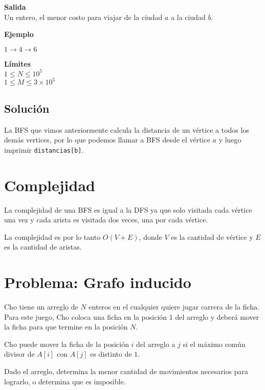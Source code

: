\textbf{Salida}\\
Un entero, el menor costo para viajar de la ciudad \(a\) a la ciudad \(b\).

\textbf{Ejemplo}\\
\begin{casebox3}
	 {
	\(1\rightarrow4\rightarrow6\)
	}
\end{casebox3}

\textbf{Límites}\\
\(1\leq N \leq 10^5\)\\
\(1\leq M \leq 3\times10^5\)

\subsection*{Solución}
La BFS que vimos anteriormente calcula la distancia de un vértice a todos los demás vertices, por lo que podemos llamar a BFS desde el vértice \(a\) y luego imprimir \lstinline|distancias[b]|.

\section{Complejidad}
La complejidad de una BFS es igual a la DFS ya que solo visitada cada vértice una vez y cada arista es visitada dos veces, una por cada vértice.

La complejidad es por lo tanto \(O(V+E)\), donde \(V\) es la cantidad de vértice y \(E\) es la cantidad de aristas.

\section*{Problema: Grafo inducido}
Cho tiene un arreglo de \(N\) enteros en el cualquier quiere jugar carrera de la ficha. Para este juego, Cho coloca una ficha en la posición \(1\) del arreglo y deberá mover la ficha para que termine en la posición \(N\).

Cho puede mover la ficha de la posición \(i\) del arreglo a \(j\) si el máximo común divisor de \(A[i]\) con \(A[j]\) es distinto de \(1\).

Dado el arreglo, determina la menor cantidad de movimientos necesarios para lograrlo, o determina que es imposible.

